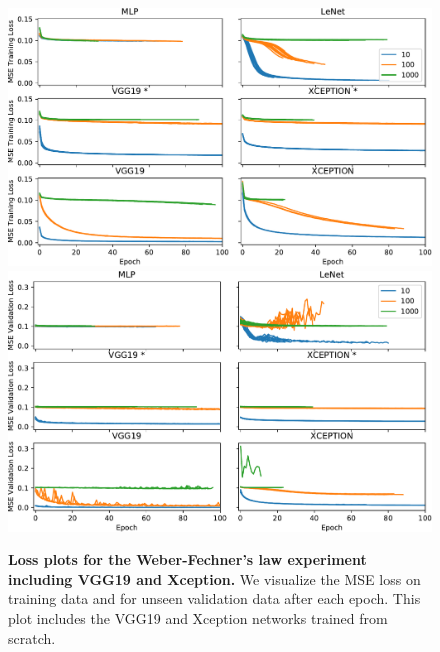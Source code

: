 \documentclass[journal]{vgtc}        %
\begin{document}
\begin{figure}[tbhp]
	\centering
	  \includegraphics[width=\linewidth]{../gfx/weber_training_loss_all.pdf}
	  \includegraphics[width=\linewidth]{../gfx/weber_validation_loss_all.pdf}
  \caption{\textbf{Loss plots for the Weber-Fechner's law experiment including VGG19 and Xception.} We visualize the MSE loss on training data and for unseen validation data after each epoch. This plot includes the VGG19 and Xception networks trained from scratch.}
	\label{fig:weber_loss_all}
\end{figure}
\end{document}
